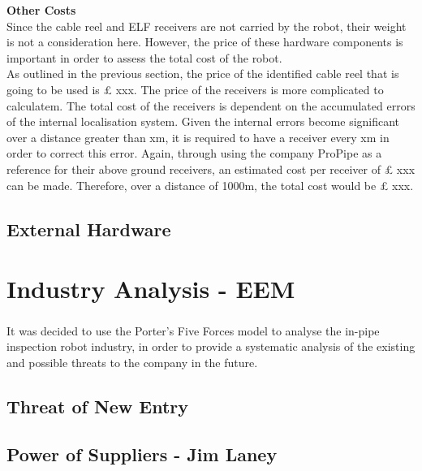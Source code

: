 \documentclass[11pt]{article}		%
\newcommand{\supercite}[1]{\textsuperscript{\cite{#1}}}		%
\begin{document}
        \textbf{Other Costs}\\

        
        Since the cable reel and ELF receivers are not carried by the robot, their weight is not a consideration here. However, the price of these hardware components is important in order to assess the total cost of the robot. \\
	    \hspace*{3ex}As outlined in the previous section, the price of the identified cable reel that is going to be used is £ xxx. The price of the receivers is more complicated to calculatem. The total cost of the receivers is dependent on the accumulated errors of the internal localisation system. Given the internal errors become significant over a distance greater than xm, it is required to have a receiver every xm in order to correct this error. Again, through using the company ProPipe as a reference for their above ground receivers, an estimated cost per receiver of £ xxx can be made. Therefore, over a distance of 1000m, the total cost would be £ xxx. 




		\subsection{External Hardware}
			
	\section{Industry Analysis - EEM}
		
		It was decided to use the Porter's Five Forces model\supercite{porter2008five} to analyse the in-pipe inspection robot industry, in order to provide a systematic analysis of the existing and possible threats to the company in the future.
		
		\subsection[Threat of New Entry]{Threat of New Entry}
				
		\subsection[Power of Suppliers]{Power of Suppliers - Jim Laney}
			
\end{document}

